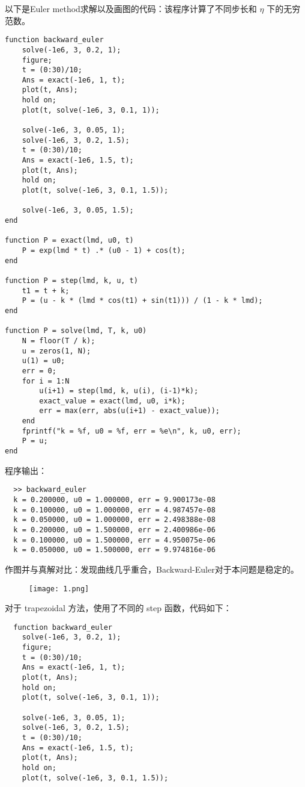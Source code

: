 \documentclass[lang=cn,a4paper,newtx,bibend=bibtex]{elegantpaper}
\begin{document}
\begin{solution}
  以下是Euler method求解以及画图的代码：该程序计算了不同步长和 $\eta$ 下的无穷范数。
\begin{verbatim}
function backward_euler
    solve(-1e6, 3, 0.2, 1);
    figure;
    t = (0:30)/10;
    Ans = exact(-1e6, 1, t);
    plot(t, Ans);
    hold on;
    plot(t, solve(-1e6, 3, 0.1, 1));
    
    solve(-1e6, 3, 0.05, 1);
    solve(-1e6, 3, 0.2, 1.5);
    t = (0:30)/10;
    Ans = exact(-1e6, 1.5, t);
    plot(t, Ans);
    hold on;
    plot(t, solve(-1e6, 3, 0.1, 1.5));
    
    solve(-1e6, 3, 0.05, 1.5);
end

function P = exact(lmd, u0, t)
    P = exp(lmd * t) .* (u0 - 1) + cos(t);
end

function P = step(lmd, k, u, t)
    t1 = t + k;
    P = (u - k * (lmd * cos(t1) + sin(t1))) / (1 - k * lmd);
end

function P = solve(lmd, T, k, u0)
    N = floor(T / k);
    u = zeros(1, N);
    u(1) = u0;
    err = 0;
    for i = 1:N
        u(i+1) = step(lmd, k, u(i), (i-1)*k);
        exact_value = exact(lmd, u0, i*k);
        err = max(err, abs(u(i+1) - exact_value));
    end
    fprintf("k = %f, u0 = %f, err = %e\n", k, u0, err);
    P = u;
end
\end{verbatim}
程序输出：
\begin{verbatim}
  >> backward_euler
  k = 0.200000, u0 = 1.000000, err = 9.900173e-08
  k = 0.100000, u0 = 1.000000, err = 4.987457e-08
  k = 0.050000, u0 = 1.000000, err = 2.498388e-08
  k = 0.200000, u0 = 1.500000, err = 2.400986e-06
  k = 0.100000, u0 = 1.500000, err = 4.950075e-06
  k = 0.050000, u0 = 1.500000, err = 9.974816e-06
\end{verbatim}
作图并与真解对比：发现曲线几乎重合，Backward-Euler对于本问题是稳定的。
\begin{figure}[H]
  \centering
  \texttt{[image: 1.png]}
\end{figure}

对于 trapezoidal 方法，使用了不同的 step 函数，代码如下：
\begin{verbatim}
  function backward_euler
    solve(-1e6, 3, 0.2, 1);
    figure;
    t = (0:30)/10;
    Ans = exact(-1e6, 1, t);
    plot(t, Ans);
    hold on;
    plot(t, solve(-1e6, 3, 0.1, 1));
    
    solve(-1e6, 3, 0.05, 1);
    solve(-1e6, 3, 0.2, 1.5);
    t = (0:30)/10;
    Ans = exact(-1e6, 1.5, t);
    plot(t, Ans);
    hold on;
    plot(t, solve(-1e6, 3, 0.1, 1.5));
    

\end{verbatim}
\end{solution}
\end{document}
